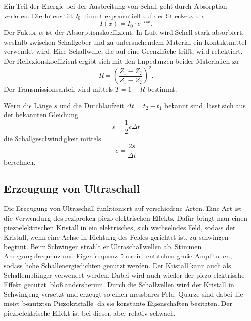 \noindent Ein Teil der Energie bei der Ausbreitung von Schall geht 
durch Absorption verloren. Die Intensität $I_0$ nimmt 
exponentiell auf der Strecke $x$ ab:
\begin{equation}
    I(x)= I_0 \cdot e^{-\alpha x}.
    \label{eqn:I}
\end{equation}
Der Faktor $\alpha$ 
ist der Absorptionskoeffizient.
In Luft wird Schall stark absorbiert, weshalb zwischen 
Schallgeber und zu untersuchendem Material ein Kontaktmittel 
verwendet wird.
\newline
Eine Schallwelle, die auf eine Grenzfläche trifft, wird 
reflektiert. Der Reflexionskoeffizient ergibt sich mit den 
Impedanzen beider Materialien zu 
\begin{equation*}
    R = \left(\frac{Z_1-Z_2}{Z_1-Z_2}\right)^2. %
\end{equation*}
Der Transmissionsanteil wird mittels $T= 1-R$ bestimmt.

\noindent Wenn die Länge $s$ und die Durchlaufzeit $\Delta t = t_2 - t_1$
bekannt sind, lässt sich aus der bekannten Gleichung
\begin{equation}
    s=\frac{1}{2}c \Delta t
    \label{eqn:s}
\end{equation}
die Schallgeschwindigkeit mittels
\begin{equation}
    c = \frac{2 s}{\Delta t}
    \label{eqn:c}
\end{equation}
berechnen.

\subsection{Erzeugung von Ultraschall}
\noindent Die Erzeugung von Ultraschall funktioniert auf verschiedene 
Arten. Eine Art ist die Verwendung des reziproken 
piezo-elektrischen Effekts. Dafür bringt man einen 
piezoelektrischen Kristall in ein elektrisches, sich
wechselndes Feld, sodass der Kristall, wenn eine Achse in 
Richtung des Feldes gerichtet ist, zu 
schwingen beginnt. Beim Schwingen strahlt er Ultraschallwellen ab. 
Stimmen Anregungsfrequenz und Eigenfrequenz überein, 
entstehen große Amplituden, sodass hohe Schallenergiedichten 
genutzt werden. Der Kristall kann auch als Schallempfänger 
verwendet werden. Dabei wird auch wieder der piezo-elektrische Effekt genutzt, bloß andersherum. 
Durch die Schallwellen wird der Kristall in Schwingung versetzt und erzeugt so einen messbares Feld. %
Quarze sind dabei die meist benutzten 
Piezokristalle, da sie konstante Eigenschaften besitzten. 
Der piezoelektrische Effekt ist bei diesen aber relativ schwach. 

